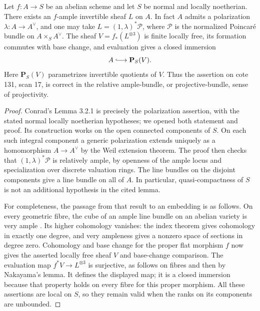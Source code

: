 \begin{theorem}
\label{A5:projectivity}
Let $f:A\to S$ be an abelian scheme and let $S$ be normal and locally
noetherian.  There exists an $f$-ample invertible sheaf $L$ on $A$.
In fact $A$ admits a polarization $\lambda:A\to A^\vee$, and one may take
$L=(1,\lambda)^*\mathcal P$, where $\mathcal P$ is the normalized Poincar\'e
bundle on $A\times_S A^\vee$.
The sheaf $V=f_*(L^{\otimes3})$ is finite locally free, its formation
commutes with base change, and evaluation gives a closed immersion
\[
             A\lhook\joinrel\longrightarrow\mathbf P_S(V).
\]
Here $\mathbf P_S(V)$ parametrizes invertible quotients of $V$.
Thus the assertion on cote 131, scan 17, is correct in the relative
ample-bundle, or projective-bundle, sense of projectivity.
\end{theorem}
\begin{proof}
Conrad's Lemma 3.2.1 \cite[p.~18]{ConradCanonical} is precisely the
polarization assertion, with the stated normal locally noetherian
hypotheses; we opened both statement and proof.  Its construction works
on the open connected components of $S$.  On each such integral component
a generic polarization extends uniquely as a homomorphism
$A\to A^\vee$ by the Weil extension theorem.  The proof then checks that
$(1,\lambda)^*\mathcal P$ is relatively ample, by openness of the ample
locus and specialization over discrete valuation rings.  The line bundles
on the disjoint components give a line bundle on all of $A$.  In particular,
quasi-compactness of $S$ is not an additional hypothesis in the cited lemma.

For completeness, the passage from that result to an embedding is as
follows.  On every geometric fibre, the cube of an ample line bundle on
an abelian variety is very ample \cite[Remark 7.3]{MilneAV}.
Its higher cohomology vanishes: the index theorem
\cite[Theorem 13.3(c)]{MilneAV} gives cohomology in exactly one degree,
and very ampleness gives a nonzero space of sections in degree zero.
Cohomology and base change for the proper flat morphism $f$ now gives
the asserted locally free sheaf $V$ and base-change comparison.
The evaluation map $f^*V\to L^{\otimes3}$ is surjective, as follows
on fibres and then by Nakayama's lemma.  It defines the displayed map;
it is a closed immersion because that property holds on every fibre for
this proper morphism.  All these assertions are local on $S$, so they
remain valid when the ranks on its components are unbounded.
\end{proof}

